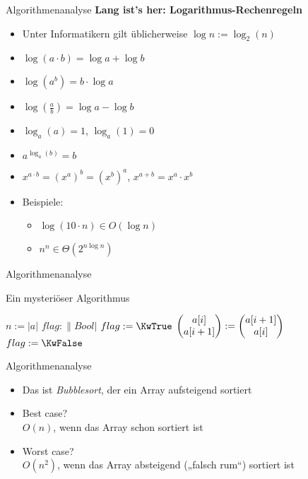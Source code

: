 \begin{frame}{Algorithmenanalyse}
	\textbf{Lang ist's her: Logarithmus-Rechenregeln} \\[0,125cm]
	\begin{itemize}
		\item Unter Informatikern gilt üblicherweise $\log n := \log_2(n)$
		\item $\log(a \cdot b) = \log a + \log b$
		\item $\log(a^b) = b \cdot \log a$
		\item $\log(\frac{a}{b}) = \log a - \log b$
		\item $\log_a(a) =1$, \quad $\log_a(1) = 0$
		\item $a^{\log_a(b)} = b$
		\item $x^{a \cdot b} = \left(x^a\right)^b = \left(x^b\right)^a$, \quad $x^{a + b} = x^a \cdot x^b$
		\item Beispiele:
		\begin{itemize}
			\item $\log(10 \cdot n) \in O(\log n)$
			\item $n^n \in \Theta(2^{n \log n})$
		\end{itemize}
	\end{itemize}
\end{frame}

\begin{frame}{Algorithmenanalyse}
	\begin{exampleblock}{Ein mysteriöser Algorithmus}
		\begin{algorithm}[H]
			 {
				$n := |a|$\;
				$flag : \|Bool|$\;
				 {
					$flag := \KwTrue$\;
					 {
						 {
							$\begin{pmatrix} a[i] \\ a[i+1] \end{pmatrix} := \begin{pmatrix} a[i+1] \\ a[i] \end{pmatrix}$ \; 
							$flag := \KwFalse$\;
						}
					}
				}
			}
		\end{algorithm}
	\end{exampleblock}
\end{frame}


\begin{frame}{Algorithmenanalyse}
	\begin{itemize}
		\item Das ist \textit{Bubblesort}, der ein Array aufsteigend sortiert
		\pause
		\item Best case?
		\pause
		\\ \impl $O(n)$, wenn das Array schon sortiert ist
		\pause
		\item Worst case?
		\pause
		\\ \impl $O(n^2)$, wenn das Array absteigend („falsch rum“) sortiert ist
	\end{itemize}
\end{frame}


